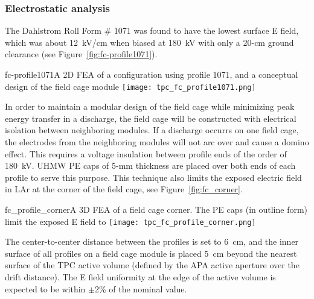 \subsubsection{Electrostatic analysis}

The Dahlstrom Roll Form \# 1071 was found to have the lowest surface E field, which was about 12~kV/cm when biased at 180~kV with only a 20-cm ground clearance (see Figure~\ref{fig:fc-profile1071}).

\begin{cdrfigure}{fc-profile1071}{A 2D FEA of a configuration using profile 1071, and a conceptual design of the field cage module}
\texttt{[image: tpc\_fc\_profile1071.png]}
\end{cdrfigure}
  
In order to maintain a modular design of the field cage while minimizing peak energy transfer in a discharge,%
the field cage will be constructed with electrical isolation between neighboring modules. %
If a discharge occurrs on one field cage, the %
electrodes from the neighboring modules will not arc over and cause a domino effect.  This requires a %
voltage insulation between profile ends of the order of 180~kV.  UHMW PE caps of 5-mm thickness are placed over both ends of each profile to serve this purpose. This technique also limits the exposed electric field in LAr at the corner of the field cage, see Figure~\ref{fig:fc_corner}. 

\begin{cdrfigure}{fc_profile_corner}{A 3D FEA of a field cage corner.  The PE caps (in outline form) limit the exposed E field to}
\texttt{[image: tpc\_fc\_profile\_corner.png]}
\end{cdrfigure}

The center-to-center distance between the profiles is set to 6~cm, and the inner surface of all profiles on a field cage module is placed 5~cm beyond the nearest surface of the TPC active volume (defined by the APA active aperture over the drift distance). The E field uniformity at the edge of the active volume is expected to be within $\pm$2\% of the nominal value.


